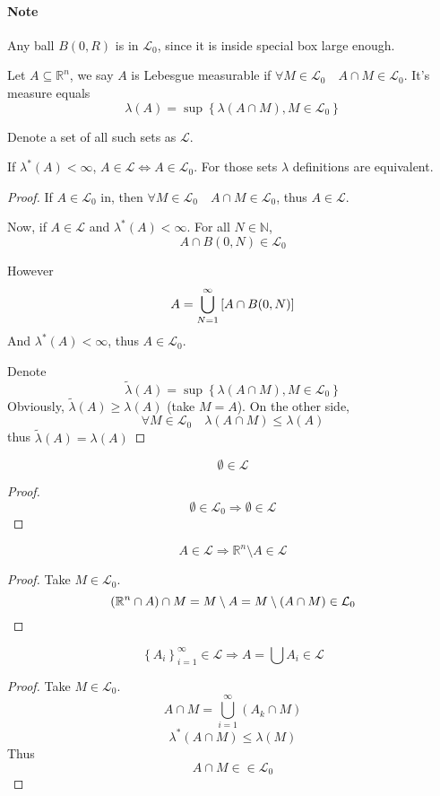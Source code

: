 \paragraph{Note}Any ball $B(0,R)$ is in $\mathcal{L_0}$, since it is inside special box large enough.
\begin{definition}
	Let $A\subseteq \mathbb{R}^n$, we say $A$ is Lebesgue measurable if $\forall M\in \mathcal{L}_0 \quad A\cap M \in \mathcal{L}_0$. It's measure equals
	$$\lambda(A) = \sup \left\{ \lambda(A\cap M), M \in \mathcal{L}_0 \right\}$$
	
	Denote a set of all such sets as $\mathcal{L}$.
\end{definition}
\begin{prop}
	If $\lambda^*(A) < \infty$, $A\in \mathcal{L} \iff A \in \mathcal{L}_0$. For those sets $\lambda$ definitions are equivalent.
	\begin{proof}
		If $A \in \mathcal{L}_0$ in, then $\forall M\in \mathcal{L}_0 \quad A\cap M \in \mathcal{L}_0$, thus $A\in \mathcal{L}$.
		
		Now, if $A\in \mathcal{L}$ and $\lambda^*(A) < \infty$. For all $N \in \mathbb{N}$,
		$$A\cap B(0,N) \in \mathcal{L}_0$$
		
		However
		$$A = \bigcup_{N=1}^\infty \qty[A\cap B(0,N)]$$
		And $\lambda^*(A) < \infty$, thus  $A \in \mathcal{L}_0$.
		
		Denote
		$$\tilde{\lambda}(A) = \sup \left\{ \lambda(A\cap M), M \in \mathcal{L}_0 \right\}$$
		Obviously, $\tilde{\lambda}(A)\geq\lambda(A) $ (take $M=A$). On the other side,
		$$\forall M\in \mathcal{L}_0 \quad \lambda(A\cap M) \leq \lambda(A)$$
		thus $\tilde{\lambda}(A)=\lambda(A) $
		
	\end{proof}
\end{prop}

\begin{prop}
	$$\emptyset \in \mathcal{L}$$
	\begin{proof}
		$$\emptyset \in \mathcal{L}_0 \Rightarrow \emptyset \in \mathcal{L}$$
	\end{proof}
\end{prop}
\begin{prop}
$$A \in \mathcal{L} \Rightarrow \mathbb{R}^n \setminus A \in \mathcal{L} $$
\begin{proof}
	Take $M\in \mathcal{L}_0$. 
	$$\qty(\mathbb{R}^n \cap A) \cap M = M \setminus A = M \setminus (A\cap M) \in \mathcal{L}_0$$
\end{proof}
\end{prop}
\begin{prop}
$$\left\{ A_i \right\}_{i=1}^\infty \in \mathcal{L} \Rightarrow A = \bigcup A_i \in \mathcal{L} $$
\begin{proof}
	Take $M\in \mathcal{L}_0$. 
	$$A\cap M = \bigcup_{i=1}^\infty (A_k\cap M) $$
	$$\lambda^*(A\cap M) \leq \lambda(M) $$
	Thus
	$$A\cap M \in \in \mathcal{L}_0$$
\end{proof}
\end{prop}

